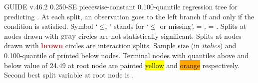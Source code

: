 \documentclass[12pt]{article}
\begin{document}
 \begin{center}
 \end{center}
GUIDE v.46.2 0.250-SE
 piecewise-constant  0.100-quantile regression tree
for predicting \texttt{}.
At each split, an observation goes to the left branch 
 if and only if the condition is satisfied.
 Symbol `$\leq_*$' stands for `$\leq$ or missing'.
\texttt{} = \texttt{}.
\texttt{} = \texttt{}.
 Splits at nodes drawn with \textbf{\textcolor{gray}{gray}} circles are not statistically significant.
 Splits at nodes drawn with \textbf{\textcolor{brown}{brown}} circles are interaction splits.
 Sample size (in \emph{italics}) and 0.100-quantile of \texttt{} printed below nodes.
 Terminal nodes with quantiles above and below value of 24.49 at root node are painted \colorbox{yellow}{yellow} and \colorbox{orange}{orange} respectively.
 Second best split variable at root node is \texttt{}.
 
\end{document}
